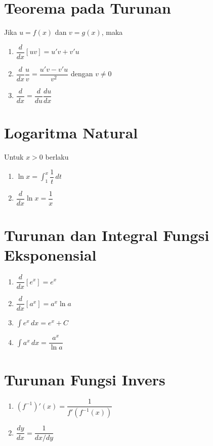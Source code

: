 \documentclass{article}
\begin{document}
\section*{Teorema pada Turunan}
Jika $u=f(x)$ dan $v=g(x)$, maka 
\begin{enumerate}
	\item $\dfrac{d}{dx} [uv] = u'v + v'u$
	\item $\dfrac{d}{dx} \dfrac{u}{v} = \dfrac{u'v-v'u}{v^2}$ dengan $v\neq 0$
	\item $\dfrac{d}{dx} = \dfrac{d}{du}\dfrac{du}{dx}$\end{enumerate}
\section*{Logaritma Natural}
Untuk $x>0$ berlaku
\begin{enumerate}
	\item $\ln x = \displaystyle \int_1^x \dfrac{1}{t} \, dt$
	\item $\dfrac{d}{dx} \ln x = \dfrac{1}{x}$
\end{enumerate}
\section*{Turunan dan Integral Fungsi Eksponensial}
\begin{enumerate}
	\item $\dfrac{d}{dx} [e^x] = e^x$
	\item $\dfrac{d}{dx} [a^x] = a^x\ln a$
	\item $\displaystyle \int e^x \, dx = e^x +C$
	\item $\displaystyle \int a^x \, dx = \dfrac{a^x}{\ln a}$
\end{enumerate}
\section*{Turunan Fungsi Invers}
\begin{enumerate}
	\item $(f^{-1})'(x) = \dfrac{1}{f'(f^{-1}(x))}$
	\item $\dfrac{dy}{dx} = \dfrac{1}{dx/dy}$
\end{enumerate}
\end{document}

